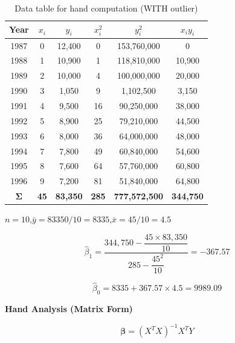 \documentclass[12pt,a4paper]{article}
\begin{document}
\begin{table}[H]
\centering
\caption{Data table for hand computation (WITH outlier)}
\begin{tabular}{cccccc}
\toprule
\textbf{Year} & $x_i$ & $y_i$ & $x_i^2$ & $y_i^2$ & $x_i y_i$ \\
\midrule
1987 & 0  & 12,400 & 0   & 153,760,000     & 0       \\
1988 & 1  & 10,900 & 1   & 118,810,000     & 10,900  \\
1989 & 2  & 10,000 & 4   & 100,000,000     & 20,000  \\
1990 & 3  & 1,050  & 9   & 1,102,500       & 3,150   \\
1991 & 4  & 9,500  & 16  & 90,250,000      & 38,000  \\
1992 & 5  & 8,900  & 25  & 79,210,000      & 44,500  \\
1993 & 6  & 8,000  & 36  & 64,000,000      & 48,000  \\
1994 & 7  & 7,800  & 49  & 60,840,000      & 54,600  \\
1995 & 8  & 7,600  & 64  & 57,760,000      & 60,800  \\
1996 & 9  & 7,200  & 81  & 51,840,000      & 64,800  \\
\midrule
$\boldsymbol{\Sigma}$ & \textbf{45} & \textbf{83,350} & \textbf{285} & \textbf{777,572,500} & \textbf{344,750} \\
\bottomrule
\end{tabular}
\end{table}

$n = 10$,\quad $\bar{y} = 83350/10 = 8335$,\quad $\bar{x} = 45/10 = 4.5$

\[
\hat{\beta}_1 = \frac{344{,}750 - \dfrac{45 \times 83{,}350}{10}}{285 - \dfrac{45^2}{10}} = -367.57
\]

\[
\hat{\beta}_0 = 8335 + 367.57 \times 4.5 = 9989.09
\]

\textbf{Hand Analysis (Matrix Form)}

\[
\bm{\beta} = (X^T X)^{-1} X^T Y
\]
\end{document}
